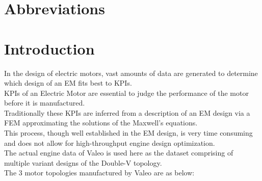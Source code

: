 \documentclass{report} %
\begin{document}
\newpage

\newpage

\begin{spacing}{1.2}
    \tableofcontents
\end{spacing}

\newpage

\newpage

\chapter*{Abbreviations}
\begin{acronym}[TDMA]
  

\end{acronym}


\newpage

\newpage

\chapter{Introduction} 
In the design of electric motors, vast amounts of data are generated to determine which design of an \ac{EM} fits best to \ac{KPI}s. \\
\ac{KPI}s of an Electric Motor are essential to judge the performance of the motor before it is manufactured. \\
Traditionally these \ac{KPI}s are inferred from a description of an \ac{EM} design via a \ac{FEM} approximating the solutions of the Maxwell’s equations. \\
This process, though well established in the \ac{EM} design, is very time consuming and does not allow for high-throughput engine design optimization. \\
The actual engine data of Valeo is used here as the dataset comprising of multiple variant designs of the Double-V topology.\\
The 3 motor topologies manufactured by Valeo are as below:
\end{document}
